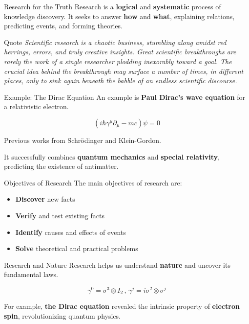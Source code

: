 \begin{frame}{Research for the Truth}
  Research is a \textbf{logical} and \textbf{systematic} process of knowledge
  discovery. It seeks to answer \textbf{how} and \textbf{what}, explaining
  relations, predicting events, and forming theories. \cite{Rajasekar2006}
\end{frame}

\begin{frame}{Quote}
  \centering
  \textit{Scientific research is a chaotic business, stumbling along amidst red
    herrings, errors, and truly creative insights. Great scientific breakthroughs
    are rarely the work of a single researcher plodding inexorably toward a goal.
    The crucial idea behind the breakthrough may surface a number of times, in
    different places, only to sink again beneath the babble of an endless
  scientific discourse.} \cite{Rajasekar2006}
\end{frame}

\begin{frame}{Example: The Dirac Equation}
  An example is \textbf{Paul Dirac's  wave equation}
  for a relativistic electron.

  \begin{equation*}
    \left( i \hbar \gamma^{\mu} \partial_{\mu} - mc \right) \psi  = 0
  \end{equation*}

  \vspace{0.5cm}
  
  Previous works from Schrödinger and Klein-Gordon. \cite{Dirac1928}

  It successfully combines \textbf{quantum mechanics}
  and \textbf{special relativity}, predicting the existence of antimatter.
\end{frame}

\begin{frame}{Objectives of Research}
  The main objectives of research are:
  \begin{itemize}
    \item \textbf{Discover} new facts
    \item \textbf{Verify} and test existing facts
    \item \textbf{Identify} causes and effects of events
    \item \textbf{Solve} theoretical and practical problems
  \end{itemize}
\end{frame}

\begin{frame}{Research and Nature}
  Research helps us understand \textbf{nature} and uncover its fundamental laws.

  \begin{equation*}
    \gamma^{0} = \sigma^{3} \otimes I_2 \, , \,
    \gamma^{j} = i \sigma^{2} \otimes \sigma^{j}
  \end{equation*}

  For example, \textbf{the Dirac equation} revealed the intrinsic property of
  \textbf{electron spin}, revolutionizing quantum physics. \cite{mehranshargh2023}
\end{frame}
